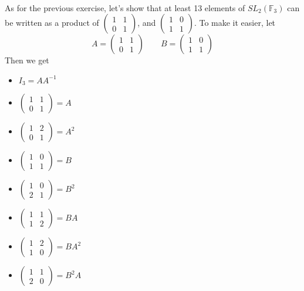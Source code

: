 \begin{solution}
    \\ As for the previous exercise, let's show that at least 13 elements of $SL_2(\mathbb{F}_3)$ can be written as a product of $\begin{pmatrix} 1 & 1\\ 0 & 1 \end{pmatrix}$, and $\begin{pmatrix} 1 & 0\\ 1 & 1 \end{pmatrix}$. To make it easier, let 
    $$A = \begin{pmatrix} 1 & 1\\ 0 & 1 \end{pmatrix} 
    \qquad B = \begin{pmatrix} 1 & 0\\ 1 & 1 \end{pmatrix}$$
    Then we get 
    \begin{multicols}{3}
        \begin{itemize}
            \item $I_3 = A A^{-1}$
            \item $\begin{pmatrix} 1 & 1\\ 0 & 1 \end{pmatrix} = A$
            \item $\begin{pmatrix} 1 & 2\\ 0 & 1 \end{pmatrix} = A^2$
            \item $\begin{pmatrix} 1 & 0\\ 1 & 1 \end{pmatrix} = B$
            \item $\begin{pmatrix} 1 & 0\\ 2 & 1 \end{pmatrix} = B^2$
            \item $\begin{pmatrix} 1 & 1\\ 1 & 2 \end{pmatrix} = BA$
            \item $\begin{pmatrix} 1 & 2\\ 1 & 0 \end{pmatrix} = BA^2$
            \item $\begin{pmatrix} 1 & 1\\ 2 & 0 \end{pmatrix} = B^2 A$

\end{itemize}
\end{multicols}
\end{solution}
